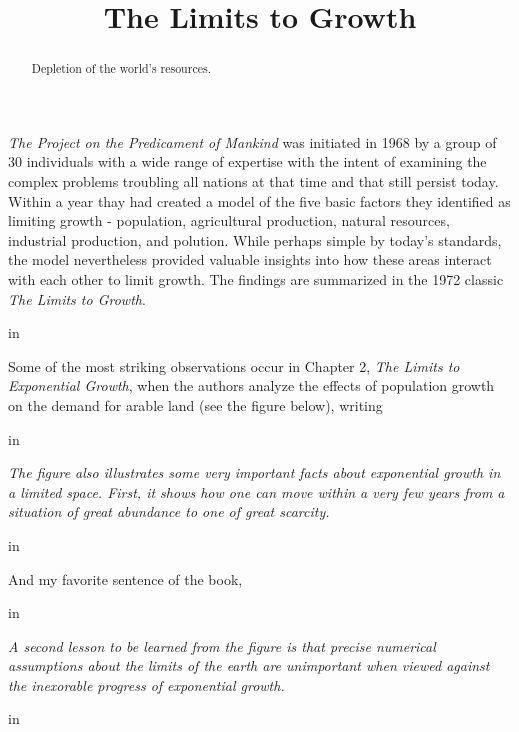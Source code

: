 \documentclass{ximera}
\title{The Limits to Growth}
\newcommand{\pskip}{\vskip 0.1 in}
\begin{document}
\begin{abstract}
Depletion of the world's resources.
\end{abstract}
\maketitle


\emph{The Project on the Predicament of Mankind} was initiated in 1968 by a group of 30 individuals with a wide range of expertise with the intent of examining the complex problems troubling all nations at that time and that still persist today. Within a year thay had created a model of the five basic factors they identified as limiting growth  - population, agricultural production, natural resources, industrial production, and polution. While perhaps simple by today's standards, the model nevertheless provided valuable insights into how these areas interact with each other to limit growth. The findings are summarized in the 1972 classic \emph{The Limits to Growth}. 


\pskip

Some of the most striking observations occur in Chapter 2, \emph{The Limits to Exponential Growth}, when the authors analyze the effects of population growth on the demand for arable land (see the figure below), writing 

\pskip

\emph{The figure also illustrates some very important facts about exponential growth in a limited space. First, it shows how one can move within a very few years from a situation of great abundance to one of great scarcity.}  

\pskip

And my favorite sentence of the book, 

\pskip

\emph{A second lesson to be learned from the figure is that precise numerical assumptions about the limits of the earth are unimportant when viewed against the inexorable progress of exponential growth.}

\pskip

 
\begin{onlineOnly}
    \begin{center}
\end{center}
\end{onlineOnly}



 
\begin{onlineOnly}
    \begin{center}
\end{center}
\end{onlineOnly}
\end{document}
